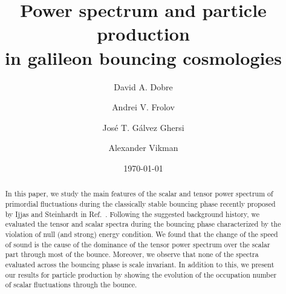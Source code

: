 \documentclass[aps,prd,reprint,twocolumn,showpacs,nofootinbib,superscriptaddress,floatfix]{revtex4-1}
\begin{document}
\title{Power spectrum and particle production\\ in galileon bouncing cosmologies}

\author{David A. Dobre}%

\author{Andrei V. Frolov}%

\author{Jos\'{e} T. G\'{a}lvez Ghersi}%

\author{Alexander Vikman}%
\date{\today}


\begin{abstract}
In this paper, we study the main features of the scalar and tensor power spectrum of primordial fluctuations during the classically stable bouncing phase recently proposed by Ijjas and Steinhardt in Ref.~\cite{Ijjas:2016tpn}. Following the suggested background history, we evaluated the tensor and scalar spectra during the bouncing phase characterized by the violation of null (and strong) energy condition. We found that the change of the speed of sound is the cause of the dominance of the tensor power spectrum over the scalar part through most of the bounce. Moreover, we observe that none of the spectra evaluated across the bouncing phase is scale invariant. In addition to this, we present our results for particle production by showing the evolution of the occupation number of scalar fluctuations through the bounce.    
\end{abstract}

\maketitle
\end{document}
